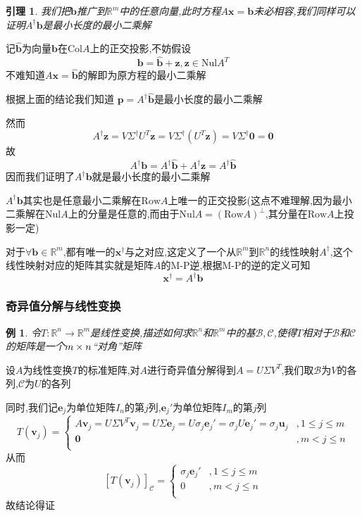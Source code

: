 \documentclass{article}
\newtheorem{lemma}{引理}[subsection]
\newtheorem{example}{例}[subsection]
\newenvironment{cproof}{%
\heiti{证明}\kaishu
}{%
}
\newcommand{\RR}{\mathbb{R}}
\newcommand{\ve}{\boldsymbol}
\newcommand{\col}{\text{Col}}
\newcommand{\row}{\text{Row}}
\newcommand{\nul}{\text{Nul}}
\begin{document}
\begin{CJK}{UTF8}{gkai}
\begin{lemma}
    我们把$\ve{b}$推广到$\RR^m$中的任意向量,此时方程$A\ve{x} = \ve{b}$未必相容,我们同样可以证明$A^\dagger \ve{b}$是最小长度的最小二乘解
    
\end{lemma}
\begin{cproof}
记$\hat{\ve{b}}$为向量$\ve{b}$在$\col A$上的正交投影,不妨假设
\[\ve{b} = \hat{\ve{b}} + \ve{z},\ve{z}\in \nul A^T\]
不难知道$A \ve{x} = \hat{\ve{b}}$的解即为原方程的最小二乘解

根据上面的结论我们知道
$\ve{p} = A^\dagger \hat{\ve{b}}$是最小长度的最小二乘解

然而
\[A^\dagger \ve{z} = V \Sigma^\dagger U^T \ve{z} =  V \Sigma^\dagger( U^T \ve{z} ) =  V \Sigma^\dagger\ve{0} = \ve{0} \]
故
\[A^\dagger \ve{b} = A^\dagger \hat{\ve{b}} + A^\dagger \ve{z} = A^\dagger \hat{\ve{b}}\]
因而我们证明了$A^\dagger \ve{b}$就是最小长度的最小二乘解\\
\end{cproof}

$A^\dagger \ve{b}$其实也是任意最小二乘解在$\row A$上唯一的正交投影(这点不难理解,因为最小二乘解在$\nul A$上的分量是任意的,而由于$\nul A = (\row A)^\bot$,其分量在$\row A$上投影一定)

对于$\forall\ve{b} \in \RR^m$,都有唯一的$\ve{x}^{\dagger}$与之对应,这定义了一个从$\RR^m$到$\RR^n$的线性映射$A^\dagger$,这个线性映射对应的矩阵其实就是矩阵$A$的M-P逆,根据M-P的逆的定义可知
\[\ve{x}^{\dagger} = A^{\dagger} \ve{b}\]

\subsubsection{奇异值分解与线性变换}
\begin{example}
    令$T: \RR^n \to \RR^m$是线性变换,描述如何求$\RR^n$和$\RR^m$中的基$\mathcal{B},\mathcal{C}$,使得$T$相对于$\mathcal{B}$和$\mathcal{C}$的矩阵是一个$m\times n$``对角''矩阵
\end{example}

\begin{cproof}
    设$A$为线性变换$T$的标准矩阵,对$A$进行奇异值分解得到$A = U \Sigma V^T$,我们取$\mathcal{B}$为$V$的各列,$\mathcal{C}$为$U$的各列

    同时,我们记$\ve{e}_j$为单位矩阵$I_n$的第$j$列,$\ve{e}_j'$为单位矩阵$I_m$的第$j$列
    \[T(\ve{v}_j) =
    \begin{cases}
         A \ve{v}_j = U \Sigma V^T \ve{v}_j =U \Sigma \ve{e}_j =U \sigma_j \ve{e}_j' = \sigma_j U \ve{e}_j' = \sigma_j \ve{u}_j   &,1 \leq j \leq m\\ 
         \ve{0} &,m < j \leq n\\
    \end{cases}
    \]
    从而
    \[[T(\ve{v}_j)]_{\mathcal{C}} =
        \begin{cases}
             \sigma_j \ve{e}_j'&,1 \leq j \leq m\\
            0&,m < j \leq n\\
        \end{cases}    
    \]
    故结论得证
\end{cproof}


\end{CJK}
\end{document}
